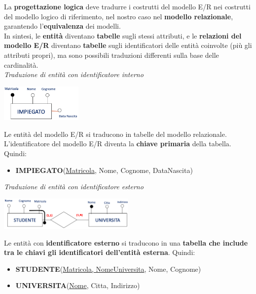 \documentclass{article}
\begin{document}
La \textbf{progettazione logica} deve tradurre i costrutti del modello E/R nei costrutti del modello logico di riferimento, nel nostro caso nel \textbf{modello relazionale}, garantendo l'\textbf{equivalenza} dei modelli.\\
In sintesi, le \textbf{entità} diventano \textbf{tabelle} sugli stessi attributi, e le \textbf{relazioni del modello E/R} diventano \textbf{tabelle} sugli identificatori delle entità coinvolte (più gli attributi propri), ma sono possibili traduzioni differenti sulla base delle cardinalità.\vspace{14pt}\\
\textit{Traduzione di entità con identificatore interno}\\
\begin{center}
    \includegraphics[width=0.3\textwidth]{foto 14.png}
\end{center}
Le entità del modello E/R si traducono in tabelle del modello relazionale. L’identificatore del modello E/R diventa la \textbf{chiave primaria} della tabella. Quindi:\\
\begin{itemize}[label={ }, leftmargin=1cm]
    \item \textbf{IMPIEGATO}(\underline{Matricola}, Nome, Cognome, DataNascita)\\
\end{itemize}
\textit{Traduzione di entità con identificatore esterno}\\
\begin{center}
    \includegraphics[width=0.5\textwidth]{foto 15.png}
\end{center}
Le entità con \textbf{identificatore esterno} si traducono in una \textbf{tabella che include tra le chiavi gli identificatori dell'entità esterna}. Quindi:
\begin{itemize}[label={ }, leftmargin=1cm]
    \item \textbf{STUDENTE}(\underline{Matricola, NomeUniversita}, Nome, Cognome)
    \item \textbf{UNIVERSITA}(\underline{Nome}, Citta, Indirizzo)\vspace{14pt}\\
\end{itemize}
\end{document}
